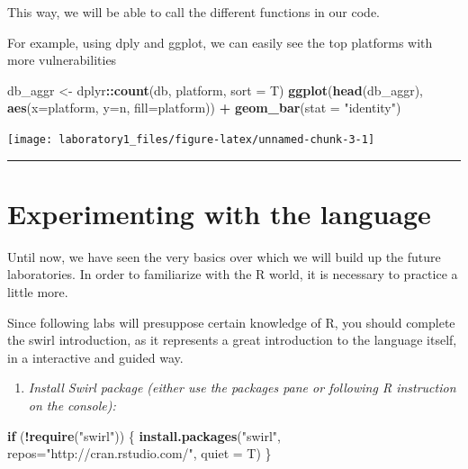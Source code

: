 \documentclass[]{article}
\newenvironment{Shaded}{\begin{snugshade}}{\end{snugshade}}
\newcommand{\KeywordTok}[1]{\textcolor[rgb]{0.13,0.29,0.53}{\textbf{#1}}}
\newcommand{\DataTypeTok}[1]{\textcolor[rgb]{0.13,0.29,0.53}{#1}}
\newcommand{\StringTok}[1]{\textcolor[rgb]{0.31,0.60,0.02}{#1}}
\newcommand{\ControlFlowTok}[1]{\textcolor[rgb]{0.13,0.29,0.53}{\textbf{#1}}}
\newcommand{\OperatorTok}[1]{\textcolor[rgb]{0.81,0.36,0.00}{\textbf{#1}}}
\newcommand{\NormalTok}[1]{#1}
\providecommand{\tightlist}{%
  \setlength{\itemsep}{0pt}\setlength{\parskip}{0pt}}
\begin{document}
This way, we will be able to call the different functions in our code.

For example, using dply and ggplot, we can easily see the top platforms
with more vulnerabilities

\begin{Shaded}
\begin{Highlighting}[]
\NormalTok{db_aggr <-}\StringTok{ }\NormalTok{dplyr}\OperatorTok{::}\KeywordTok{count}\NormalTok{(db, platform, }\DataTypeTok{sort =}\NormalTok{ T)}
\KeywordTok{ggplot}\NormalTok{(}\KeywordTok{head}\NormalTok{(db_aggr), }\KeywordTok{aes}\NormalTok{(}\DataTypeTok{x=}\NormalTok{platform, }\DataTypeTok{y=}\NormalTok{n, }\DataTypeTok{fill=}\NormalTok{platform)) }\OperatorTok{+}\StringTok{ }\KeywordTok{geom_bar}\NormalTok{(}\DataTypeTok{stat =} \StringTok{"identity"}\NormalTok{)}
\end{Highlighting}
\end{Shaded}

\begin{center}\texttt{[image: laboratory1\_files/figure-latex/unnamed-chunk-3-1]} \end{center}

\begin{center}\rule{0.5\linewidth}{\linethickness}\end{center}

\section{Experimenting with the
language}\label{experimenting-with-the-language}

Until now, we have seen the very basics over which we will build up the
future laboratories. In order to familiarize with the R world, it is
necessary to practice a little more.

Since following labs will presuppose certain knowledge of R, you should
complete the swirl introduction, as it represents a great introduction
to the language itself, in a interactive and guided way.

\begin{enumerate}
\def\labelenumi{\arabic{enumi}.}
\tightlist
\item
  \emph{Install Swirl package (either use the packages pane or following
  R instruction on the console):}
\end{enumerate}

\begin{Shaded}
\begin{Highlighting}[]
\ControlFlowTok{if}\NormalTok{ (}\OperatorTok{!}\KeywordTok{require}\NormalTok{(}\StringTok{"swirl"}\NormalTok{)) \{}
  \KeywordTok{install.packages}\NormalTok{(}\StringTok{"swirl"}\NormalTok{, }\DataTypeTok{repos=}\StringTok{"http://cran.rstudio.com/"}\NormalTok{, }\DataTypeTok{quiet =}\NormalTok{ T)}
\NormalTok{\}}
\end{Highlighting}
\end{Shaded}
\end{document}
